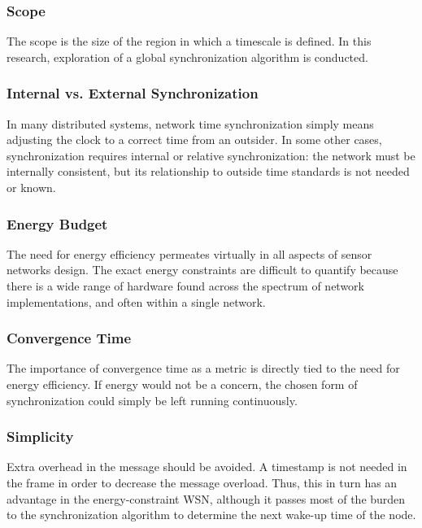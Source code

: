 \documentclass[journal]{IEEEtran}
\begin{document}
\subsubsection{\textbf{Scope}} The scope is the size of the region in
which a timescale is defined. In this research, exploration of a global
synchronization algorithm is conducted.
\subsubsection{\textbf{Internal vs. External Synchronization}}
In many distributed systems, network time
synchronization simply means adjusting the clock to a correct time
from an outsider. In some other cases, synchronization requires internal or relative synchronization: the 
network must be internally consistent, but its relationship to 
outside time standards is not needed or known.
\subsubsection{\textbf{Energy Budget}} The need for energy efficiency
permeates virtually in all aspects of sensor networks design. The
exact energy constraints are difficult to quantify because there is
a wide range of hardware found across the spectrum of network
implementations, and often within a single network.
\subsubsection{\textbf{Convergence Time}} The importance of convergence time
as a metric is directly tied to the need for energy efficiency. If
energy would not be a concern, the chosen form of synchronization
could simply be left running continuously.
\subsubsection{\textbf{Simplicity}} Extra overhead in the message should be avoided. A
timestamp is not needed in the frame in order to decrease the
message overload. Thus, this in turn has an advantage in the energy-constraint WSN, although
it passes most of the burden to the synchronization algorithm to determine the next
wake-up time of the node.
\end{document}
